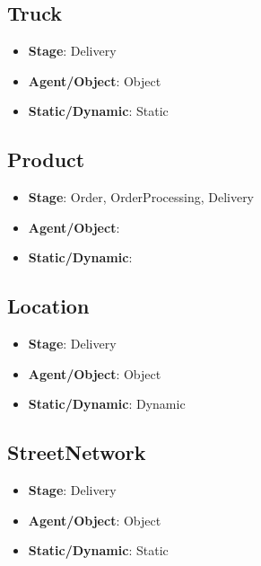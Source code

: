 \documentclass[12pt]{article}
\begin{document}
\subsection{Truck}%
\label{sub:truck}
\begin{itemize}
    \item \textbf{Stage}: Delivery
    \item \textbf{Agent/Object}: Object
    \item \textbf{Static/Dynamic}: Static
\end{itemize}

\subsection{Product}%
\label{sub:product}
\begin{itemize}
    \item \textbf{Stage}: Order, OrderProcessing, Delivery
    \item \textbf{Agent/Object}: 
    \item \textbf{Static/Dynamic}: 
\end{itemize}

\subsection{Location}%
\label{sub:location}
\begin{itemize}
    \item \textbf{Stage}: Delivery
    \item \textbf{Agent/Object}: Object
    \item \textbf{Static/Dynamic}: Dynamic
\end{itemize}

\subsection{StreetNetwork}%
\label{sub:street_network}
\begin{itemize}
    \item \textbf{Stage}: Delivery
    \item \textbf{Agent/Object}: Object
    \item \textbf{Static/Dynamic}: Static
\end{itemize}
\end{document}
